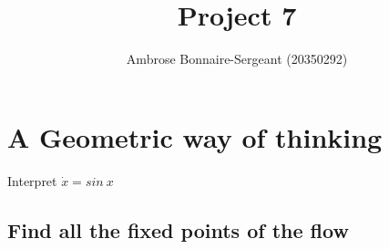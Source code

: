 \documentclass[a4paper]{article}
\title{Project 7}
\author{Ambrose Bonnaire-Sergeant (20350292)}
\begin{document}
\maketitle

\section{A Geometric way of thinking}

Interpret $\dot{x} = sin\ x$

\subsection{Find all the fixed points of the flow}
\end{document}
